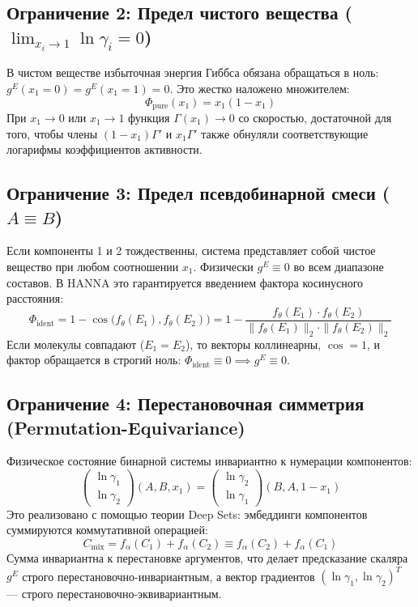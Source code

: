 \documentclass[12pt,a4paper]{article}
\begin{document}
\subsection[Ограничение 2: Предел чистого вещества]{Ограничение 2: Предел чистого вещества (\texorpdfstring{$\lim_{x_i \to 1} \ln \gamma_i = 0$}{lim xi to 1 ln gamma i = 0})}
В чистом веществе избыточная энергия Гиббса обязана обращаться в ноль: $g^E(x_1 = 0) = g^E(x_1 = 1) = 0$. 
Это жестко наложено множителем:
\begin{equation}
    \Phi_{\text{pure}}(x_1) = x_1 (1 - x_1)
\end{equation}
При $x_1 \to 0$ или $x_1 \to 1$ функция $\Gamma(x_1) \to 0$ со скоростью, достаточной для того, чтобы члены $(1-x_1)\Gamma'$ и $x_1\Gamma'$ также обнуляли соответствующие логарифмы коэффициентов активности.

\subsection{Ограничение 3: Предел псевдобинарной смеси (\texorpdfstring{$A \equiv B$}{A identical to B})}
Если компоненты 1 и 2 тождественны, система представляет собой чистое вещество при любом соотношении $x_1$. Физически $g^E \equiv 0$ во всем диапазоне составов.
В HANNA это гарантируется введением фактора косинусного расстояния:
\begin{equation}
    \Phi_{\text{ident}} = 1 - \cos\big(f_\theta(E_1), f_\theta(E_2)\big) = 1 - \frac{f_\theta(E_1) \cdot f_\theta(E_2)}{\|f_\theta(E_1)\|_2 \cdot \|f_\theta(E_2)\|_2}
\end{equation}
Если молекулы совпадают ($E_1 = E_2$), то векторы коллинеарны, $\cos = 1$, и фактор обращается в строгий ноль: $\Phi_{\text{ident}} \equiv 0 \implies g^E \equiv 0$.

\subsection[Ограничение 4: Перестановочная симметрия]{Ограничение 4: Перестановочная симметрия (Permutation-Equivariance)}
Физическое состояние бинарной системы инвариантно к нумерации компонентов:
\begin{equation}
    \begin{pmatrix} \ln \gamma_1 \\ \ln \gamma_2 \end{pmatrix} (A, B, x_1) = \begin{pmatrix} \ln \gamma_2 \\ \ln \gamma_1 \end{pmatrix} (B, A, 1 - x_1)
\end{equation}
Это реализовано с помощью теории Deep Sets: эмбеддинги компонентов суммируются коммутативной операцией:
\begin{equation}
    C_{\text{mix}} = f_\alpha(C_1) + f_\alpha(C_2) \equiv f_\alpha(C_2) + f_\alpha(C_1)
\end{equation}
Сумма инвариантна к перестановке аргументов, что делает предсказание скаляра $g^E$ строго перестановочно-инвариантным, а вектор градиентов $(\ln \gamma_1, \ln \gamma_2)^T$ — строго перестановочно-эквивариантным.
\end{document}
